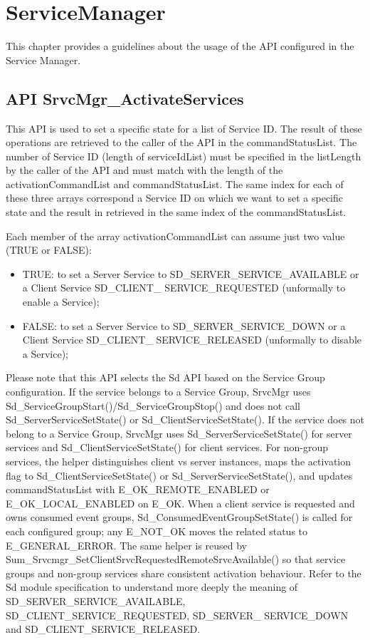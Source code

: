 \chapter{ServiceManager}
\label{SrvcMgr}

This chapter provides a guidelines about the usage of the API configured in the Service Manager.

\section{API SrvcMgr\_ActivateServices}
This API is used to set a specific state for a list of Service ID. The result of these operations are retrieved to the caller of the API in the commandStatusList.
The number of Service ID (length of serviceIdList) must be specified in the listLength by the caller of the API and must match with the length of the 
activationCommandList and commandStatusList. 
The same index for each of these three arrays correspond a Service ID on which we want to set a specific state and the result in retrieved in the same index
of the commandStatusList.

Each member of the array activationCommandList can assume just two value (TRUE or FALSE):
\begin{itemize}
\item TRUE: to set a Server Service to SD\_SERVER\_SERVICE\_AVAILABLE or a Client Service SD\_CLIENT\_ SERVICE\_REQUESTED (unformally to enable a Service);
\item FALSE: to set a Server Service to SD\_SERVER\_SERVICE\_DOWN or a Client Service SD\_CLIENT\_ SERVICE\_RELEASED (unformally to disable a Service); 
\end{itemize}
Please note that this API selects the Sd API based on the Service Group configuration. If the service belongs to a Service Group, SrvcMgr uses Sd\_ServiceGroupStart()/Sd\_ServiceGroupStop() and does not call Sd\_ServerServiceSetState() or Sd\_ClientServiceSetState(). If the service does not belong to a Service Group, SrvcMgr uses Sd\_ServerServiceSetState() for server services and Sd\_ClientServiceSetState() for client services.
For non-group services, the helper distinguishes client vs server instances, maps the activation flag to Sd\_ClientServiceSetState() or Sd\_ServerServiceSetState(), and updates commandStatusList with E\_OK\_REMOTE\_ENABLED or E\_OK\_LOCAL\_ENABLED on E\_OK. When a client service is requested and owns consumed event groups, Sd\_ConsumedEventGroupSetState() is called for each configured group; any E\_NOT\_OK moves the related status to E\_GENERAL\_ERROR. The same helper is reused by Sum\_Srvcmgr\_SetClientSrvcRequestedRemoteSrvcAvailable() so that service groups and non-group services share consistent activation behaviour.
Refer to the Sd module specification to understand more deeply the meaning of SD\_SERVER\_SERVICE\_AVAILABLE, SD\_CLIENT\_SERVICE\_REQUESTED, SD\_SERVER\_ SERVICE\_DOWN and SD\_CLIENT\_SERVICE\_RELEASED.


